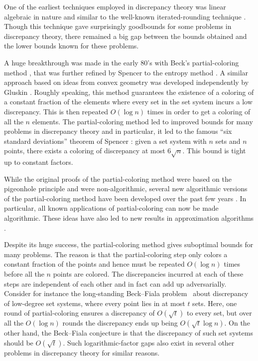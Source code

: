 \documentclass[11pt]{article}
\numberwithin{equation}{section}
\theoremstyle{definition}
\theoremstyle{plain}
\begin{document}
One of the earliest techniques employed in discrepancy
theory  %
was linear algebraic in nature and similar to the well-known iterated-rounding technique \cite{B08,BF81,LRSbook}. Though this technique gave surprisingly goodbounds for some problems in discrepancy
theory,  %
there remained a big gap between the bounds obtained and the lower bounds known for these problems. 

A huge breakthrough was made in the early 80's with Beck's partial-coloring method \cite{Beck81b}, that was further refined by Spencer to the entropy method \cite{Spencer85}. A similar approach based on ideas from convex geometry was developed independently by Gluskin \cite{Glu89}. Roughly speaking, this method guarantees the existence of a coloring of a constant fraction of the elements where every set in the set system incurs a low discrepancy. This is then repeated $O(\log n)$ times in order to get a coloring of all the $n$ elements. The partial-coloring method led to improved bounds for many problems in discrepancy
theory  %
and in particular, it led to the famous ``six standard deviations'' theorem of Spencer \cite{Spencer85}: given a set system with $n$ sets and $n$ points, there exists a coloring of discrepancy at most $6\sqrt{n}$. This bound is tight up to constant factors.

While the original proofs of the partial-coloring method were based on the pigeonhole principle and were non-algorithmic, several new algorithmic versions of the partial-coloring method have been developed over the past few years \cite{B10,LM12,Rot14,HSS14,ES14}. In particular, all known applications of partial-coloring \cite{Spencer85,Mat09} can now be made algorithmic. These ideas have also led to new results in approximation algorithms \cite{R13,BCKL14,BN15,NTZ13}.

Despite its huge success, the partial-coloring method gives
%
suboptimal    %
bounds for many problems. The reason is that the partial-coloring step only colors a constant fraction of the points and hence must be repeated $O(\log n)$ times before all the $n$ points are colored. The discrepancies incurred at each of these steps are independent of each other and in fact can add up adversarially. Consider for instance the long-standing Beck--Fiala problem~\cite{BF81} about discrepancy of low-degree set systems, where every point lies in at most $t$ sets. Here, one round of partial-coloring ensures a discrepancy of $O(\sqrt{t})$ to every set, but over all the $O(\log n)$ rounds the discrepancy ends up being $O(\sqrt{t}\log n)$. On the other hand, the Beck--Fiala conjecture is that the discrepancy of such set systems should be $O(\sqrt{t})$. Such logarithmic-factor gaps also exist in several other problems in discrepancy
theory  %
for similar reasons.
\end{document}
